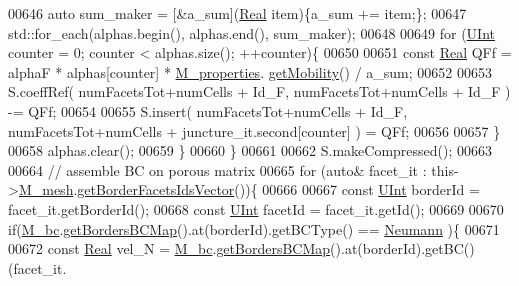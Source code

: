 \begin{DoxyCode}
00646             \textcolor{keyword}{auto} sum\_maker = [&a\_sum](\hyperlink{namespaceFVCode3D_a40c1f5588a248569d80aa5f867080e83}{Real} item)\{a\_sum += item;\};
00647             std::for\_each(alphas.begin(), alphas.end(), sum\_maker);
00648 
00649             \textcolor{keywordflow}{for} (\hyperlink{namespaceFVCode3D_a4bf7e328c75d0fd504050d040ebe9eda}{UInt} counter = 0; counter < alphas.size(); ++counter)\{
00650                                 
00651                 \textcolor{keyword}{const} \hyperlink{namespaceFVCode3D_a40c1f5588a248569d80aa5f867080e83}{Real} QFf = alphaF * alphas[counter] * \hyperlink{classFVCode3D_1_1MatrixHandler_ad17a7941b1b8272f50fc6e1c660103fa}{M\_properties}.
      \hyperlink{classFVCode3D_1_1PropertiesMap_a810ea62ca881e4db57acd601bcea23cf}{getMobility}() / a\_sum;
00652                 
00653                 S.coeffRef( numFacetsTot+numCells + Id\_F, numFacetsTot+numCells + Id\_F ) -= QFf;
00654                 
00655                 S.insert( numFacetsTot+numCells + Id\_F, numFacetsTot+numCells + juncture\_it.second[counter]
      ) = QFf; 
00656                 
00657             \}
00658             alphas.clear();
00659         \}
00660     \}
00661                             
00662     S.makeCompressed();                      
00663 
00664     \textcolor{comment}{// assemble BC on porous matrix}
00665     \textcolor{keywordflow}{for} (\textcolor{keyword}{auto}& facet\_it : this->\hyperlink{classFVCode3D_1_1MatrixHandler_a72f185cb557fc2e8023bd09a074f685c}{M\_mesh}.\hyperlink{classFVCode3D_1_1Rigid__Mesh_aa72b7fad937f0d1586fc10b176ef5d3e}{getBorderFacetsIdsVector}())\{
00666                 
00667         \textcolor{keyword}{const} \hyperlink{namespaceFVCode3D_a4bf7e328c75d0fd504050d040ebe9eda}{UInt} borderId = facet\_it.getBorderId();
00668         \textcolor{keyword}{const} \hyperlink{namespaceFVCode3D_a4bf7e328c75d0fd504050d040ebe9eda}{UInt} facetId = facet\_it.getId();
00669 
00670         \textcolor{keywordflow}{if}(\hyperlink{classFVCode3D_1_1StiffMatrix_a23e3ffc97fcf112958e9966cac41e9d3}{M\_bc}.\hyperlink{classFVCode3D_1_1BoundaryConditions_a5b53a81bdab88709fae14892bfe6a7c9}{getBordersBCMap}().at(borderId).getBCType() == 
      \hyperlink{namespaceFVCode3D_a73660061f11f1671164ce171a053f8c5a30212425b27314b01b40f4984dbf850a}{Neumann} )\{
00671                         
00672             \textcolor{keyword}{const} \hyperlink{namespaceFVCode3D_a40c1f5588a248569d80aa5f867080e83}{Real} vel\_N = \hyperlink{classFVCode3D_1_1StiffMatrix_a23e3ffc97fcf112958e9966cac41e9d3}{M\_bc}.\hyperlink{classFVCode3D_1_1BoundaryConditions_a5b53a81bdab88709fae14892bfe6a7c9}{getBordersBCMap}().at(borderId).getBC()(facet\_it.

\end{DoxyCode}

